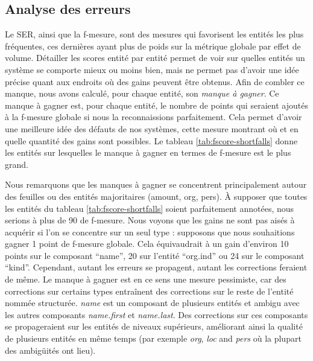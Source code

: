 \documentclass[12pt,a4paper,times,twoside,openright]{report}
\begin{document}
    
        \subsection{Analyse des erreurs}
        \label{subsec:cascades-error-analysis}
Le SER, ainsi que la f-mesure, sont des mesures qui favorisent les entités les plus fréquentes, ces dernières ayant plus de poids sur la métrique globale par effet de volume. Détailler les scores entité par entité permet de voir sur quelles entités un système se comporte mieux ou moins bien, mais ne permet pas d'avoir une idée précise quant aux endroits où des gains peuvent être obtenus. Afin de combler ce manque, nous avons calculé, pour chaque entité, son \emph{manque à gagner}. Ce manque à gagner est, pour chaque entité, le nombre de points qui seraient ajoutés à la f-mesure globale si nous la reconnaissions parfaitement. Cela permet d'avoir une meilleure idée des défauts de nos systèmes, cette mesure montrant où et en quelle quantité des gains sont possibles.
Le tableau \ref{tab:fscore-shortfalls} donne les entités sur lesquelles le manque à gagner en termes de f-mesure est le plus grand.

Nous remarquons que les manques à gagner se concentrent principalement autour des feuilles ou des entités majoritaires (amount, org, pers). À supposer que toutes les entités du tableau \ref{tab:fscore-shortfalls} soient parfaitement annotées, nous serions à plus de 90 de f-mesure. Nous voyons que les gains ne sont pas aisés à acquérir si l'on se concentre sur un seul type : supposons que nous souhaitions gagner 1 point de f-mesure globale. Cela équivaudrait à un gain d'environ 10 points sur le composant ``name'', 20 sur l'entité ``org.ind'' ou 24 sur le composant ``kind''. Cependant, autant les erreurs se propagent, autant les corrections feraient de même. Le manque à gagner est en ce sens une mesure pessimiste, car des corrections sur certains types entraînent des corrections sur le reste de l'entité nommée structurée. \emph{name} est un composant de plusieurs entités et ambigu avec les autres composants \emph{name.first} et \emph{name.last}. Des corrections sur ces composants se propageraient sur les entités de niveaux supérieurs, améliorant ainsi la qualité de plusieurs entités en même temps (par exemple \emph{org}, \emph{loc} and \emph{pers} où la plupart des ambigüités ont lieu).
\end{document}
